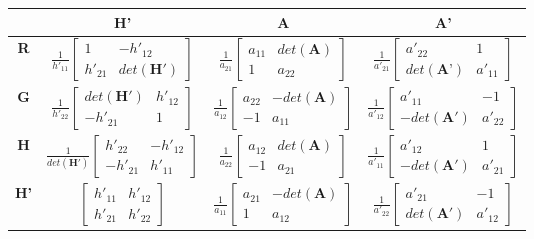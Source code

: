 \documentclass[a4paper,twocolumn,10pt]{article}
\begin{document}
{\small\begin{tabular}{@{}|@{}c@{}|@{}c@{}|@{}c@{}|@{}c@{}|}
\hline & \textbf{H'} & \textbf{A} & \textbf{A'}\\
\hline \textbf{R} & $\frac{1}{h'_{11}}\begin{bmatrix}1 & -h'_{12}\\ h'_{21} & det(\textbf{H}')\end{bmatrix}$ & $\frac{1}{a_{21}}\begin{bmatrix}a_{11} & det(\textbf{A})\\ 1 & a_{22}\end{bmatrix}$ & $\frac{1}{a'_{21}}\begin{bmatrix}a'_{22} & 1\\ det(\textbf{A'}) & a'_{11}\end{bmatrix}$\\
\hline \textbf{G} & $\frac{1}{h'_{22}}\begin{bmatrix}det(\textbf{H}') & h'_{12}\\ -h'_{21} & 1\end{bmatrix}$ & $\frac{1}{a_{12}}\begin{bmatrix}a_{22} & -det(\textbf{A})\\ -1 & a_{11}\end{bmatrix}$ & $\frac{1}{a'_{12}}\begin{bmatrix}a'_{11} & -1\\ -det(\textbf{A}') & a'_{22}\end{bmatrix}$\\
\hline \textbf{H} & $\frac{1}{det(\textbf{H}')}\begin{bmatrix}h'_{22} & -h'_{12}\\ -h'_{21} & h'_{11}\end{bmatrix}$ & $\frac{1}{a_{22}}\begin{bmatrix}a_{12} & det(\textbf{A})\\ -1 & a_{21}\end{bmatrix}$ & $\frac{1}{a'_{11}}\begin{bmatrix}a'_{12} & 1\\ -det(\textbf{A}') & a'_{21}\end{bmatrix}$\\
\hline \textbf{H'} & $\begin{bmatrix}h'_{11} & h'_{12}\\ h'_{21} & h'_{22}\end{bmatrix}$ & $\frac{1}{a_{11}}\begin{bmatrix}a_{21} & -det(\textbf{A})\\ 1 & a_{12}\end{bmatrix}$ & $\frac{1}{a'_{22}}\begin{bmatrix}a'_{21} & -1\\ det(\textbf{A}') & a'_{12}\end{bmatrix}$\\

\end{tabular}}
\end{document}
